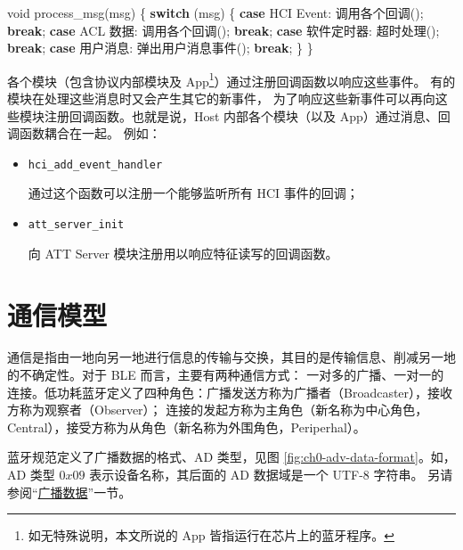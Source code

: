 \documentclass[
  12pt,
]{book}
\newenvironment{Shaded}{\begin{snugshade}}{\end{snugshade}}
\newcommand{\ControlFlowTok}[1]{\textcolor[rgb]{0.13,0.29,0.53}{\textbf{#1}}}
\newcommand{\DataTypeTok}[1]{\textcolor[rgb]{0.13,0.29,0.53}{#1}}
\newcommand{\NormalTok}[1]{#1}
\begin{document}
\begin{Shaded}
\begin{Highlighting}[]
\DataTypeTok{void}\NormalTok{ process_msg(msg)}
\NormalTok{\{}
    \ControlFlowTok{switch}\NormalTok{ (msg)}
\NormalTok{    \{}
    \ControlFlowTok{case}\NormalTok{ HCI Event:}
\NormalTok{        调用各个回调();}
        \ControlFlowTok{break}\NormalTok{;}
    \ControlFlowTok{case}\NormalTok{ ACL 数据:}
\NormalTok{        调用各个回调();}
        \ControlFlowTok{break}\NormalTok{;}
    \ControlFlowTok{case}\NormalTok{ 软件定时器:}
\NormalTok{        超时处理();}
        \ControlFlowTok{break}\NormalTok{;}
    \ControlFlowTok{case}\NormalTok{ 用户消息:}
\NormalTok{        弹出用户消息事件();}
        \ControlFlowTok{break}\NormalTok{;}
\NormalTok{    \}}
\NormalTok{\}}
\end{Highlighting}
\end{Shaded}

各个模块（包含协议内部模块及 App\footnote{如无特殊说明，本文所说的 App 皆指运行在芯片上的蓝牙程序。}）通过注册回调函数以响应这些事件。
有的模块在处理这些消息时又会产生其它的新事件，
为了响应这些新事件可以再向这些模块注册回调函数。也就是说，Host 内部各个模块（以及 App）通过消息、回调函数耦合在一起。
例如：

\begin{itemize}
\item
  \texttt{hci\_add\_event\_handler}

  通过这个函数可以注册一个能够监听所有 HCI 事件的回调；
\item
  \texttt{att\_server\_init}

  向 ATT Server 模块注册用以响应特征读写的回调函数。
\end{itemize}

\hypertarget{ux901aux4fe1ux6a21ux578b}{%
\section{通信模型}\label{ux901aux4fe1ux6a21ux578b}}

通信是指由一地向另一地进行信息的传输与交换，其目的是传输信息、削减另一地的不确定性。对于 BLE 而言，主要有两种通信方式：
一对多的广播、一对一的连接。低功耗蓝牙定义了四种角色：广播发送方称为广播者（Broadcaster），接收方称为观察者（Observer）；
连接的发起方称为主角色（新名称为中心角色，Central），接受方称为从角色（新名称为外围角色，Periperhal）。

蓝牙规范定义了广播数据的格式、AD 类型，见图 \ref{fig:ch0-adv-data-format}。如，AD 类型 \(0x09\) 表示设备名称，其后面的 AD 数据域是一个 UTF-8 字符串。
另请参阅``\protect\hyperlink{ch1-adv-data-edit}{广播数据}''一节。
\end{document}

